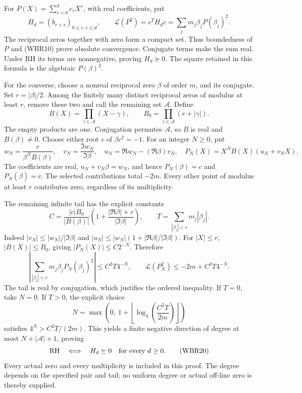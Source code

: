 For \(P(X)=\sum_{r=0}^dc_rX^r\), with real coefficients, put \[
H_d=(b_{r+s})_{0\le r,s\le d},\qquad
\mathcal L(P^2)=c^TH_dc
=\sum_jm_j\beta_jP(\beta_j)^2.
\tag{WBR14}
\] The reciprocal zeros together with zero form a compact set. Thus boundedness of \(P\) and (WBR10) prove absolute convergence. Conjugate terms make the sum real. Under RH its terms are nonnegative, proving \(H_d\succeq0\). The square retained in this formula is the algebraic \(P(\beta)^2\).

For the converse, choose a nonreal reciprocal zero \(\beta\) of order \(m\), and its conjugate. Set \(r=|\beta|/2\). Among the finitely many distinct reciprocal zeros of modulus at least \(r\), remove these two and call the remaining set \(\mathcal A\). Define \[
B(X)=\prod_{\gamma\in\mathcal A}(X-\gamma),\qquad
B_0=\prod_{\gamma\in\mathcal A}(r+|\gamma|).
\tag{WBR15}
\] The empty products are one. Conjugation permutes \(\mathcal A\), so \(B\) is real and \(B(\beta)\ne0\). Choose either root \(c\) of \(\beta c^2=-1\). For an integer \(N\ge0\), put \[
w_N=\frac{c}{\beta^NB(\beta)},\quad
v_N=\frac{\Im w_N}{\Im\beta},\quad
u_N=\Re w_N-(\Re\beta)v_N,\quad
P_N(X)=X^NB(X)(u_N+v_NX).
\tag{WBR16}
\] The coefficients are real, \(u_N+v_N\beta=w_N\), and hence \(P_N(\beta)=c\) and \(P_N(\overline\beta)=\overline c\). The selected contributions total \(-2m\). Every other point of modulus at least \(r\) contributes zero, regardless of its multiplicity.

The remaining infinite tail has the explicit constants \[
C=\frac{|c|B_0}{|B(\beta)|}
 \left(1+\frac{|\Re\beta|+r}{|\Im\beta|}\right),\qquad
T=\sum_{|\beta_j|<r}m_j|\beta_j|.
\tag{WBR17}
\] Indeed \(|v_N|\le |w_N|/|\Im\beta|\) and \(|u_N|\le |w_N|(1+|\Re\beta|/|\Im\beta|)\). For \(|X|\le r\), \(|B(X)|\le B_0\), giving \(|P_N(X)|\le C2^{-N}\). Therefore \[
\left|\sum_{|\beta_j|<r}m_j\beta_jP_N(\beta_j)^2\right|
\le C^2T4^{-N},\qquad
\mathcal L(P_N^2)\le-2m+C^2T4^{-N}.
\tag{WBR18}
\] The tail is real by conjugation, which justifies the ordered inequality. If \(T=0\), take \(N=0\). If \(T>0\), the explicit choice \[
N=\max\!\left(0,\ 1+
 \left\lfloor\log_4\left(\frac{C^2T}{2m}\right)\right\rfloor\right)
\tag{WBR19}
\] satisfies \(4^N>C^2T/(2m)\). This yields a finite negative direction of degree at most \(N+|\mathcal A|+1\), proving \[
\mathrm{RH}\quad\Longleftrightarrow\quad
H_d\succeq0\quad\hbox{for every }d\ge0.
\tag{WBR20}
\] Every actual zero and every multiplicity is included in this proof. The degree depends on the specified pair and tail; no uniform degree or actual off-line zero is thereby supplied.

